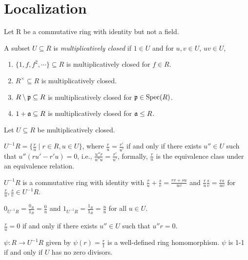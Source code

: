 \chapter{Localization}

Let R be a commutative ring with identity but not a field.

\begin{recall}
    A subset $U \subseteq R$ is \emph{multiplicatively closed} if $1 \in U$ and for $u,v \in U$, $uv \in U$, 
\end{recall}

\begin{example}
    \begin{enumerate}
        \item $\{1,f,f^2,\cdots\} \subseteq R$ is multiplicatively closed for $f \in R$.
        \item $R^\times \subseteq R$ is multiplicatively closed.
        \item $R \setminus \mathfrak{p} \subseteq R$ is multiplicatively closed for $\mathfrak{p} \in \operatorname{Spec}(R)$.
        \item $1 + \mathfrak{a} \subseteq R$ is multiplicatively closed for $\mathfrak{a} \leq R$.
    \end{enumerate}
\end{example}

\noindent Let $U \subseteq R$ be multiplicatively closed.

\begin{recall} \label{defOfMultiplicativelyClosedSet}
    $U^{-1}R = \{\frac{r}{u} \mid r \in R, u \in U\}$, where $\frac{r}{u} = \frac{r'}{u'}$ if and only if there exists $u'' \in U$ such that $u''(ru'-r'u) = 0$, i.e., $\frac{u''r}{u''u} = \frac{r'}{u'}$, formally, $\frac{r}{u}$ is the equivalence class under an equivalence relation. \par 
    $U^{-1}R$ is a commutative ring with identity with $\frac{r}{u} + \frac{s}{v} = \frac{rv+su}{uv}$ and $\frac{r}{u} \frac{s}{v} = \frac{rs}{uv}$ for $\frac{r}{u},\frac{s}{v} \in U^{-1}R$. \par 
    $0_{U^{-1}R} = \frac{0_R}{1_R} = \frac{0}{u}$ and $1_{U^{-1}R} = \frac{1_{R}}{1_{R}} = \frac{u}{u}$ for all $u \in U$. \par 
    $\frac{r}{u} = 0$ if and only if there exists $u'' \in U$ such that $u''r = 0$. \par 
    $\psi: R \to U^{-1}R$ given by $\psi(r) = \frac{r}{1}$ is a well-defined ring homomorphism. $\psi$ is 1-1 if and only if $U$ has no zero divisors.
\end{recall}

